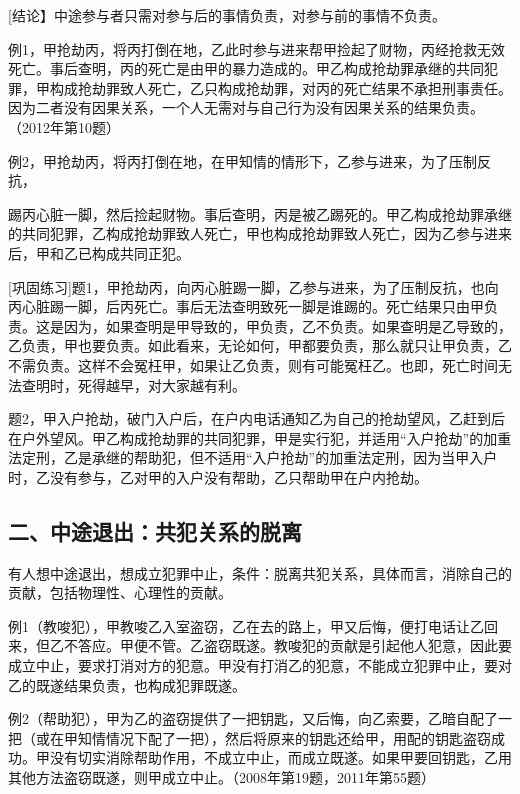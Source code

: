 [结论】中途参与者只需对参与后的事情负责，对参与前的事情不负责。

例1，甲抢劫丙，将丙打倒在地，乙此时参与进来帮甲捡起了财物，丙经抢救无效死亡。事后查明，丙的死亡是由甲的暴力造成的。甲乙构成抢劫罪承继的共同犯罪，甲构成抢劫罪致人死亡，乙只构成抢劫罪，对丙的死亡结果不承担刑事责任。因为二者没有因果关系，一个人无需对与自己行为没有因果关系的结果负责。（2012年第10题）

例2，甲抢劫丙，将丙打倒在地，在甲知情的情形下，乙参与进来，为了压制反抗，

踢丙心脏一脚，然后捡起财物。事后查明，丙是被乙踢死的。甲乙构成抢劫罪承继的共同犯罪，乙构成抢劫罪致人死亡，甲也构成抢劫罪致人死亡，因为乙参与进来后，甲和乙已构成共同正犯。

[巩固练习]题1，甲抢劫丙，向丙心脏踢一脚，乙参与进来，为了压制反抗，也向丙心脏踢一脚，后丙死亡。事后无法查明致死一脚是谁踢的。死亡结果只由甲负责。这是因为，如果查明是甲导致的，甲负责，乙不负责。如果查明是乙导致的，乙负责，甲也要负责。如此看来，无论如何，甲都要负责，那么就只让甲负责，乙不需负责。这样不会冤枉甲，如果让乙负责，则有可能冤枉乙。也即，死亡时间无法查明时，死得越早，对大家越有利。

题2，甲入户抢劫，破门入户后，在户内电话通知乙为自己的抢劫望风，乙赶到后在户外望风。甲乙构成抢劫罪的共同犯罪，甲是实行犯，并适用“入户抢劫”的加重法定刑，乙是承继的帮助犯，但不适用“入户抢劫”的加重法定刑，因为当甲入户时，乙没有参与，乙对甲的入户没有帮助，乙只帮助甲在户内抢劫。

\subsection*{二、中途退出：共犯关系的脱离}

有人想中途退出，想成立犯罪中止，条件：脱离共犯关系，具体而言，消除自己的贡献，包括物理性、心理性的贡献。


例1（教唆犯），甲教唆乙入室盗窃，乙在去的路上，甲又后悔，便打电话让乙回来，但乙不答应。甲便不管。乙盗窃既遂。教唆犯的贡献是引起他人犯意，因此要成立中止，要求打消对方的犯意。甲没有打消乙的犯意，不能成立犯罪中止，要对乙的既遂结果负责，也构成犯罪既遂。

例2（帮助犯），甲为乙的盗窃提供了一把钥匙，又后悔，向乙索要，乙暗自配了一把（或在甲知情情况下配了一把），然后将原来的钥匙还给甲，用配的钥匙盗窃成功。甲没有切实消除帮助作用，不成立中止，而成立既遂。如果甲要回钥匙，乙用其他方法盗窃既遂，则甲成立中止。（2008年第19题，2011年第55题）

